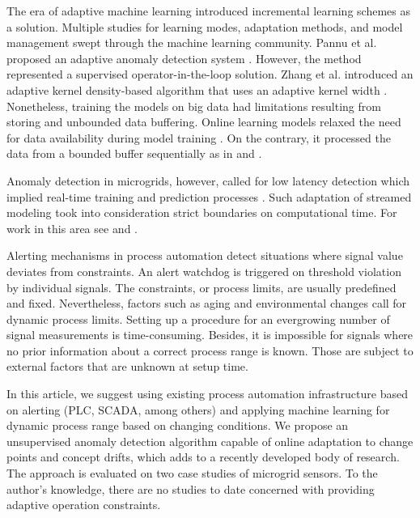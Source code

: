 The era of adaptive machine learning introduced incremental learning schemes as a solution. Multiple studies for learning modes, adaptation methods, and model management swept through the machine learning community. Pannu et al. proposed an adaptive anomaly detection system \cite{Pannu2012}. However, the method represented a supervised operator-in-the-loop solution. Zhang et al. introduced an adaptive kernel density-based algorithm that uses an adaptive kernel width \cite{Zhang201850}. Nonetheless, training the models on big data had limitations resulting from storing and unbounded data buffering. Online learning models relaxed the need for data availability during model training \cite{Gama2014}. On the contrary, it processed the data from a bounded buffer sequentially as in \cite{Bosman201514} and \cite{Ahmad2017134}. 

Anomaly detection in microgrids, however, called for low latency detection which implied real-time training and prediction processes \cite{Liu2017}. Such adaptation of streamed modeling took into consideration strict boundaries on computational time. For work in this area see \cite{Wang2020114145} and \cite{Dai2022}.

Alerting mechanisms in process automation detect situations where signal value deviates from constraints. An alert watchdog is triggered on threshold violation by individual signals. The constraints, or process limits, are usually predefined and fixed. Nevertheless, factors such as aging and environmental changes call for dynamic process limits. Setting up a procedure for an evergrowing number of signal measurements is time-consuming. Besides, it is impossible for signals where no prior information about a correct process range is known. Those are subject to external factors that are unknown at setup time. 

In this article, we suggest using existing process automation infrastructure based on alerting (PLC, SCADA, among others) and applying machine learning for dynamic process range based on changing conditions. We propose an unsupervised anomaly detection algorithm capable of online adaptation to change points and concept drifts, which adds to a recently developed body of research. The approach is evaluated on two case studies of microgrid sensors. To the author's knowledge, there are no studies to date concerned with providing adaptive operation constraints.

